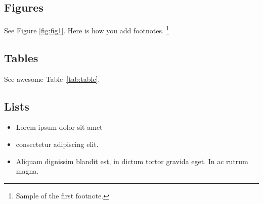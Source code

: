 \documentclass{article}
\begin{document}
\subsection{Figures}
\lipsum[10] 
See Figure \ref{fig:fig1}. Here is how you add footnotes. \footnote{Sample of the first footnote.}
\lipsum[11] 


\subsection{Tables}
\lipsum[12]
See awesome Table~\ref{tab:table}.



\subsection{Lists}
\begin{itemize}
\item Lorem ipsum dolor sit amet
\item consectetur adipiscing elit. 
\item Aliquam dignissim blandit est, in dictum tortor gravida eget. In ac rutrum magna.
\end{itemize}
\end{document}
